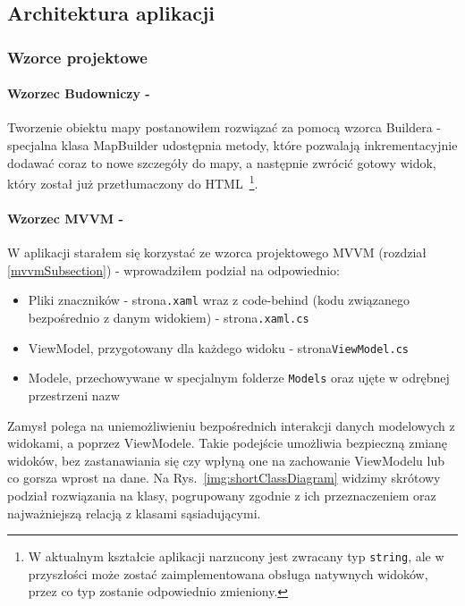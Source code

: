 \subsection{Architektura aplikacji}

\subsubsection{Wzorce projektowe}

\paragraph{Wzorzec Budowniczy -}
Tworzenie obiektu mapy postanowiłem rozwiązać za pomocą wzorca Buildera - 
specjalna klasa MapBuilder udostępnia metody, które pozwalają inkrementacyjnie 
dodawać coraz to nowe szczegóły do mapy, a następnie zwrócić gotowy widok, 
który został już przetłumaczony do HTML~\cprotect\footnote{%
    W aktualnym kształcie aplikacji narzucony jest zwracany typ \verb|string|, 
    ale w przyszłości może zostać zaimplementowana obsługa natywnych widoków,
    przez co typ zostanie odpowiednio zmieniony.}.

\paragraph{Wzorzec MVVM -}
W aplikacji starałem się korzystać ze wzorca projektowego MVVM (rozdział \ref{mvvmSubsection}) - 
wprowadziłem podział na odpowiednio:
\begin{itemize}
    \item Pliki znaczników - strona\verb|.xaml| wraz z code-behind 
    (kodu związanego bezpośrednio z danym widokiem) - strona\verb|.xaml.cs|
    \item ViewModel, przygotowany dla każdego widoku - strona\verb|ViewModel.cs|
    \item Modele, przechowywane w specjalnym folderze \verb|Models| oraz ujęte w odrębnej przestrzeni nazw
\end{itemize}

Zamysł polega na uniemożliwieniu bezpośrednich interakcji danych 
modelowych z widokami, a poprzez ViewModele. Takie podejście umożliwia bezpieczną zmianę 
widoków, bez zastanawiania się czy wpłyną one na zachowanie ViewModelu lub co gorsza wprost na dane.
Na Rys.~\ref{img:shortClassDiagram} widzimy skrótowy podział rozwiązania na klasy, pogrupowany 
zgodnie z ich przeznaczeniem oraz najważniejszą relacją z klasami sąsiadującymi.
\clearpage

